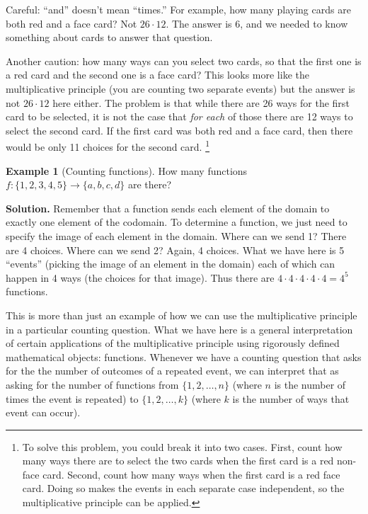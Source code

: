 \documentclass[12pt,]{book}
\theoremstyle{plain}
\theoremstyle{definition}
\theoremstyle{definition}
\newtheorem{example}[theorem]{Example}
\theoremstyle{definition}
\numberwithin{equation}{chapter}
\begin{document}
\hypertarget{p-723}{}%
Careful: ``and'' doesn't mean ``times.'' For example, how many playing cards are both red and a face card? Not \(26 \cdot 12\). The answer is 6, and we needed to know something about cards to answer that question.%
\par
\hypertarget{p-724}{}%
Another caution: how many ways can you select two cards, so that the first one is a red card and the second one is a face card? This looks more like the multiplicative principle (you are counting two separate events) but the answer is not \(26 \cdot 12\) here either. The problem is that while there are 26 ways for the first card to be selected, it is not the case that \emph{for each} of those there are 12 ways to select the second card. If the first card was both red and a face card, then there would be only 11 choices for the second card. \footnote{To solve this problem, you could break it into two cases. First, count how many ways there are to select the two cards when the first card is a red non-face card. Second, count how many ways when the first card is a red face card. Doing so makes the events in each separate case independent, so the multiplicative principle can be applied.\label{fn-5}}%
\begin{example}[Counting functions]\label{example-counting-functions-all}
\hypertarget{p-725}{}%
How many functions \(f:\{1,2,3,4,5\} \to \{a,b,c,d\}\) are there?%
\par\smallskip%
\noindent\textbf{Solution.}\hypertarget{solution-85}{}\quad%
\hypertarget{p-726}{}%
Remember that a function sends each element of the domain to exactly one element of the codomain.  To determine a function, we just need to specify the image of each element in the domain.  Where can we send 1?  There are 4 choices.  Where can we send 2?  Again, 4 choices.  What we have here is 5 ``events'' (picking the image of an element in the domain) each of which can happen in 4 ways (the choices for that image).  Thus there are \(4 \cdot 4 \cdot 4 \cdot 4 \cdot 4 = 4^5\) functions.%
\par
\hypertarget{p-727}{}%
This is more than just an example of how we can use the multiplicative principle in a particular counting question.  What we have here is a general interpretation of certain applications of the multiplicative principle using rigorously defined mathematical objects: functions.  Whenever we have a counting question that asks for the the number of outcomes of a repeated event, we can interpret that as asking for the number of functions from \(\{1,2,\ldots, n\}\) (where \(n\) is the number of times the event is repeated) to  \(\{1,2,\ldots,k\}\) (where \(k\) is the number of ways that event can occur).%
\end{example}
\typeout{************************************************}
\typeout{************************************************}
\end{document}
